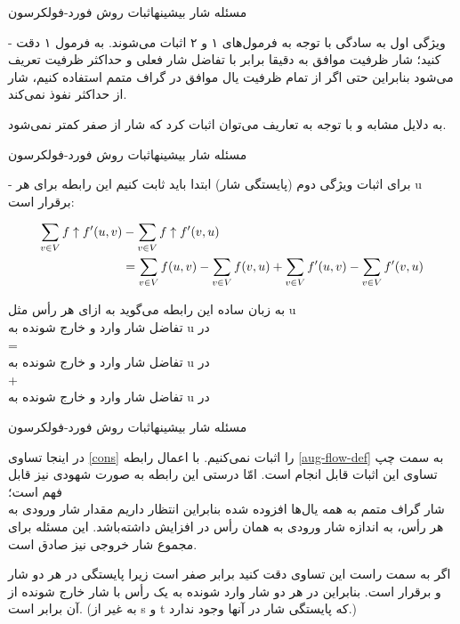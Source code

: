\begin{itemframe}{مسئله شار بیشینه}{اثبات روش فورد-فولکرسون}
\item[-]
ویژگی اول به سادگی با توجه به فرمول‌های ۱ و ۲ اثبات می‌شوند. به فرمول ۱ دقت کنید‍؛ شار ظرفیت موافق به دقیقا برابر با تفاضل شار فعلی و حداکثر ظرفیت تعریف می‌شود بنابراین حتی اگر از تمام ظرفیت یال موافق در گراف متمم استفاده کنیم، شار
از حداکثر نفوذ نمی‌کند.
\item
به دلایل مشابه و با توجه به تعاریف می‌توان اثبات کرد که شار
از صفر کمتر نمی‌شود.
\end{itemframe}
\begin{itemframe}{مسئله شار بیشینه}{اثبات روش فورد-فولکرسون}
\item[-]
برای اثبات ویژگی دوم (پایستگی شار) ابتدا باید ثابت کنیم این رابطه برای هر u برقرار است:

\begin{align}
\sum_{v\in V} f \uparrow f'(u, v)  & - \sum_{v\in V} f \uparrow f'(v, u) \notag \\
&=
 \sum_{v\in V} f(u, v) - \sum_{v\in V} f (v, u)
+
\sum_{v\in V} f'(u, v) - \sum_{v\in V} f'(v, u)
\label{cons}
\end{align}
\item

به زبان ساده این رابطه می‌گوید به ازای هر رأس مثل u\\
تفاضل شار وارد و خارج شونده به u در
 \\
=\\
تفاضل شار وارد و خارج شونده به u در
 \\
+\\
تفاضل شار وارد و خارج شونده به u در
\\


\end{itemframe}
\begin{itemframe}{مسئله شار بیشینه}{اثبات روش فورد-فولکرسون}
\item
در اینجا تساوی \ref{cons} را اثبات نمی‌کنیم. با اعمال رابطه \ref{aug-flow-def} به سمت چپ تساوی این اثبات قابل انجام است. امّا درستی این رابطه به صورت شهودی نیز قابل فهم است؛
\\
شار گراف متمم به همه یال‌ها افزوده شده بنابراین انتظار داریم مقدار شار ورودی به هر رأس، به اندازه شار ورودی به همان رأس در
افزایش داشته‌باشد. این مسئله برای مجموع شار خروجی نیز صادق است.
\item
اگر به سمت راست این تساوی دقت کنید برابر صفر است زیرا پایستگی در هر دو شار
و
برقرار است. بنابراین در هر دو شار وارد شونده به یک رأس با شار خارج شونده از آن برابر است. (به غیر از s و t که پایستگی شار در آنها وجود ندارد.)
\end{itemframe}

